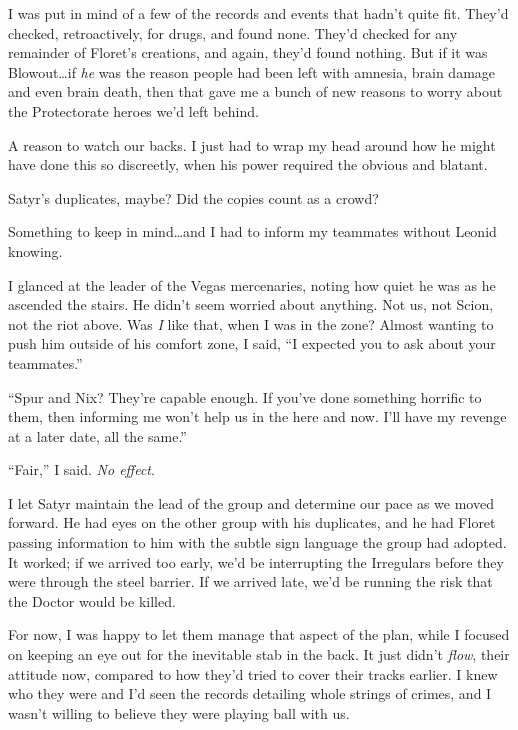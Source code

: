 I was put in mind of a few of the records and events that hadn't quite fit.  They'd checked, retroactively, for drugs, and found none.  They'd checked for any remainder of Floret's creations, and again, they'd found nothing.  But if it was Blowout\ldots if \emph{he} was the reason people had been left with amnesia, brain damage and even brain death, then that gave me a bunch of new reasons to worry about the Protectorate heroes we'd left behind.



A reason to watch our backs.  I just had to wrap my head around how he might have done this so discreetly, when his power required the obvious and blatant.



Satyr's duplicates, maybe?  Did the copies count as a crowd?



Something to keep in mind\ldots and I had to inform my teammates without Leonid knowing.



I glanced at the leader of the Vegas mercenaries, noting how quiet he was as he ascended the stairs.  He didn't seem worried about anything.  Not us, not Scion, not the riot above.  Was \emph{I} like that, when I was in the zone?  Almost wanting to push him outside of his comfort zone, I said, ``I expected you to ask about your teammates.''



``Spur and Nix?  They're capable enough.  If you've done something horrific to them, then informing me won't help us in the here and now.  I'll have my revenge at a later date, all the same.''



``Fair,'' I said.  \emph{No effect}.



I let Satyr maintain the lead of the group and determine our pace as we moved forward.  He had eyes on the other group with his duplicates, and he had Floret passing information to him with the subtle sign language the group had adopted.  It worked; if we arrived too early, we'd be interrupting the Irregulars before they were through the steel barrier.  If we arrived late, we'd be running the risk that the Doctor would be killed.



For now, I was happy to let them manage that aspect of the plan, while I focused on keeping an eye out for the inevitable stab in the back.  It just didn't \emph{flow}, their attitude now, compared to how they'd tried to cover their tracks earlier.  I knew who they were and I'd seen the records detailing whole strings of crimes, and I wasn't willing to believe they were playing ball with us.



